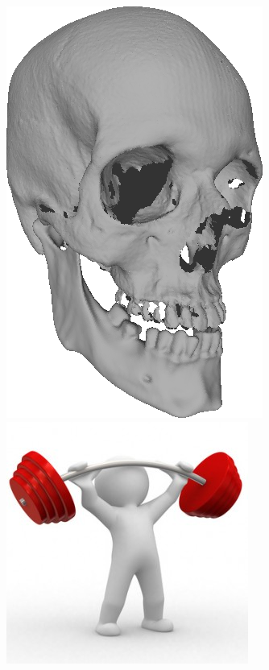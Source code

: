 \begin{frame}
\begin{columns}
    \begin{column}{0.2\textwidth}
      \includegraphics[width=.9\textwidth]{images/skull2}\\
      \bigskip
      \includegraphics[width=.9\textwidth]{images/strength}
    \end{column}
  \end{columns}
\end{frame}

